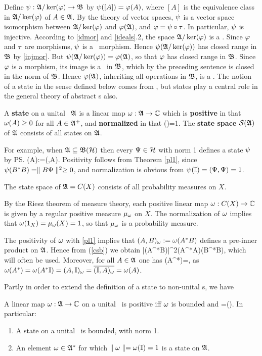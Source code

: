 Define $\psi:{\frak A}/\ker(\varphi)\rightarrow{\frak B}$ by $\psi([A])=\varphi(A)$, where $[A]$ is
the equivalence class in ${\frak A}/\ker(\varphi)$ of $A\in{\frak A}$.  By the theory
of vector spaces, $\psi$ is a vector space isomorphism between
${\frak A}/\ker(\varphi)$ and $\varphi({\frak A})$, and $\varphi=\psi\circ\tau$. In particular,
$\psi$ is injective.  According to \ref{idmor} and \ref{ideals}.2, the
space ${\frak A}/\ker(\varphi)$ is a \ca.  Since $\varphi$ and $\tau$ are morphisms,
$\psi$ is a \ca\ morphism. Hence $\psi({\frak A}/\ker(\varphi))$ has closed range
in ${\frak B}$ by \ref{injmor}.  But $\psi({\frak A}/\ker(\varphi))=\varphi({\frak A})$, so that
$\varphi$ has closed range in ${\frak B}$.  Since $\varphi$ is a morphism, its
image is a \sta\ in ${\frak B}$, which by the preceding sentence is closed in
the norm of ${\frak B}$. Hence $\varphi({\frak A})$, inheriting all operations in ${\frak B}$,
is a \ca.\enp {} The notion of a state in the
sense defined below comes from \qm, but states play a central role in
the general theory of abstract \ca s also.
\begin{Definition}
A {\bf state} on a unital \ca\ ${\frak A}$ is a linear map $\omega:{\frak A}\rightarrow{\Bbb C}$
which is {\bf positive} in that $\omega(A)\geq 0$ for all $A\in{\frak A}^+$, and
{\bf normalized} in that \be \om(\I)=1.  \ee The {\bf state
space} ${\cal S}({\frak A})$ of ${\frak A}$ consists of all states on ${\frak A}$. \end{Definition}

For example, when ${\frak A}\subseteq{\frak B}({\cal H})$ then every $\Psi\in{\cal H}$ with norm 1
defines a state $\psi$ by \be \ps(A):=(\Ps,A\Ps).  \ee
Positivity follows from Theorem \ref{pl1}, since $\psi(B^*B)=\parallel
B\Psi\parallel^2\geq 0$, and normalization is obvious from
$\psi({\Bbb I})=(\Psi,\Psi)=1$.
\begin{Theorem}
The state space of ${\frak A}=C(X)$ consists of all probability measures on
$X$. \end{Theorem}

By the Riesz theorem of measure theory, each positive linear map
$\omega:C(X)\rightarrow{\Bbb C}$ is given by a regular positive measure $\mu_{\omega}$ on
$X$. The normalization of $\omega$ implies that
$\omega(1_X)=\mu_{\omega}(X)=1$, so that $\mu_{\omega}$ is a probability
measure. \enp

The positivity of $\omega$ with \ref{pl1} implies that
$(A,B)_{\omega}:=\omega(A^*B)$ defines a pre-inner product on ${\frak A}$. Hence
from (\ref{csb}) we obtain \be |\om(A^*B)|^2\leq\om(A^*A)\om(B^*B),
 \ee which will often be used. Moreover, for all $A\in{\frak A}$ one
has \be \om(A^*)=,  \ee as
$\omega(A^*)=\omega(A^*{\Bbb I})=(A,{\Bbb I})_{\omega}=\overline{({\Bbb I},A)_{\omega}}=\omega(A)$.

Partly in order to extend the definition of a state to non-unital \ca
s, we have
\begin{Proposition}
A linear map $\omega:{\frak A}\rightarrow{\Bbb C}$ on a unital \ca\ is positive iff $\omega$ is
bounded and \be \n\om\n=\om(\I). \ee In particular:
\begin{enumerate}
\item
A state on a unital \ca\ is bounded, with norm 1.
\item
An element $\omega\in{\frak A}^*$ for which $\parallel\omega\parallel=\omega({\Bbb I})=1$ is a state on
${\frak A}$.
\end{enumerate}
\end{Proposition}

